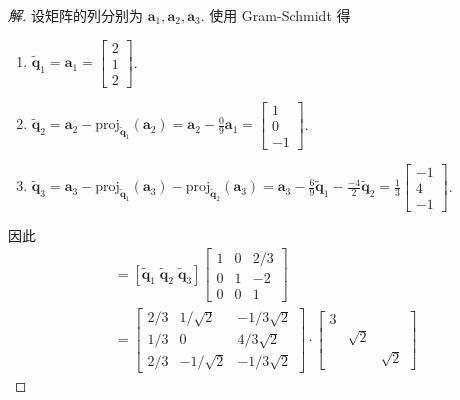 \documentclass[UTF8]{ctexart}
\begin{document}
\begin{proof}[解]
  设矩阵的列分别为 \(\boldsymbol{a}_{1}, \boldsymbol{a}_{2}, \boldsymbol{a}_{3}\).
  使用 Gram-Schmidt 得
\begin{enumerate}
\item \(\widetilde{\boldsymbol{q}}_{1} = \boldsymbol{a}_{1} = \begin{bmatrix} 2 \\ 1 \\2 \end{bmatrix}\).
\item \(\widetilde{\boldsymbol{q}}_{2} = \boldsymbol{a}_2 - \mathrm{proj}_{\widetilde{\boldsymbol{q}}_1}(\boldsymbol{a}_2) = \boldsymbol{a}_2 - \frac{0}{9}\boldsymbol{a}_1 = \begin{bmatrix} 1 \\ 0 \\-1\end{bmatrix}\).
\item \(\widetilde{\boldsymbol{q}}_3 = \boldsymbol{a}_3 - \mathrm{proj}_{\widetilde{\boldsymbol{q}}_1}(\boldsymbol{a}_3) - \mathrm{proj}_{\widetilde{\boldsymbol{q}}_2}(\boldsymbol{a}_3)=\boldsymbol{a}_3-\frac{6}{9}\widetilde{\boldsymbol{q}}_1 - \frac{-4}{2} \widetilde{\boldsymbol{q}}_2 = \frac{1}{3}\begin{bmatrix}-1\\4\\-1\end{bmatrix}\).
\end{enumerate}
因此
\begin{align*}
  [\boldsymbol{a}_1 \; \boldsymbol{a}_2 \; \boldsymbol{a}_3]
  & = [\widetilde{\boldsymbol{q}}_1\; \widetilde{\boldsymbol{q}}_2 \; \widetilde{\boldsymbol{q}}_{3}]
  \begin{bmatrix}
    1 & 0 & 2/3 \\
    0 & 1 & -2 \\
    0 & 0 & 1
  \end{bmatrix} \\
  &=
  \begin{bmatrix}
    2/3 & 1/\sqrt{2} &  -1/3\sqrt{2} \\
    1/3 & 0          &  4/3\sqrt{2} \\
    2/3 & -1/\sqrt{2} &  -1/3\sqrt{2}
  \end{bmatrix}
  \cdot
  \begin{bmatrix}
    3 \\ {} & \sqrt{2} \\ {} & {} & \sqrt{2}
  \end{bmatrix}

\end{align*}
\end{proof}
\end{document}
